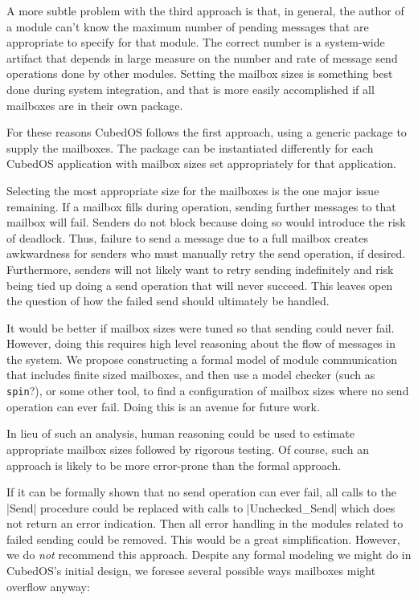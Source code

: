 A more subtle problem with the third approach is that, in general, the author of a module can't
know the maximum number of pending messages that are appropriate to specify for that module. The
correct number is a system-wide artifact that depends in large measure on the number and rate of
message send operations done by other modules. Setting the mailbox sizes is something best done
during system integration, and that is more easily accomplished if all mailboxes are in their
own package.

For these reasons CubedOS follows the first approach, using a generic package to supply the
mailboxes. The package can be instantiated differently for each CubedOS application with mailbox
sizes set appropriately for that application.

Selecting the most appropriate size for the mailboxes is the one major issue remaining. If a
mailbox fills during operation, sending further messages to that mailbox will fail. Senders do
not block because doing so would introduce the risk of deadlock. Thus, failure to send a message
due to a full mailbox creates awkwardness for senders who must manually retry the send
operation, if desired. Furthermore, senders will not likely want to retry sending indefinitely
and risk being tied up doing a send operation that will never succeed. This leaves open the
question of how the failed send should ultimately be handled.

It would be better if mailbox sizes were tuned so that sending could never fail. However, doing
this requires high level reasoning about the flow of messages in the system. We propose
constructing a formal model of module communication that includes finite sized mailboxes, and
then use a model checker (such as \texttt{spin}?), or some other tool, to find a configuration
of mailbox sizes where no send operation can ever fail. Doing this is an avenue for future work.

In lieu of such an analysis, human reasoning could be used to estimate appropriate mailbox sizes
followed by rigorous testing. Of course, such an approach is likely to be more error-prone than
the formal approach.

If it can be formally shown that no send operation can ever fail, all calls to the |Send|
procedure could be replaced with calls to |Unchecked_Send| which does not return an error
indication. Then all error handling in the modules related to failed sending could be removed.
This would be a great simplification. However, we do \emph{not} recommend this approach. Despite
any formal modeling we might do in CubedOS's initial design, we foresee several possible ways
mailboxes might overflow anyway:


